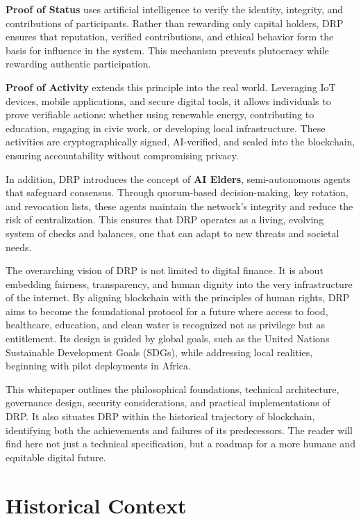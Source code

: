 \documentclass[11pt,a4paper]{article}
\begin{document}
\textbf{Proof of Status} uses artificial intelligence to verify the identity, integrity, and contributions of participants. Rather than rewarding only capital holders, DRP ensures that reputation, verified contributions, and ethical behavior form the basis for influence in the system. This mechanism prevents plutocracy while rewarding authentic participation.

\textbf{Proof of Activity} extends this principle into the real world. Leveraging IoT devices, mobile applications, and secure digital tools, it allows individuals to prove verifiable actions: whether using renewable energy, contributing to education, engaging in civic work, or developing local infrastructure. These activities are cryptographically signed, AI-verified, and sealed into the blockchain, ensuring accountability without compromising privacy.

In addition, DRP introduces the concept of \textbf{AI Elders}, semi-autonomous agents that safeguard consensus. Through quorum-based decision-making, key rotation, and revocation lists, these agents maintain the network's integrity and reduce the risk of centralization. This ensures that DRP operates as a living, evolving system of checks and balances, one that can adapt to new threats and societal needs.

The overarching vision of DRP is not limited to digital finance. It is about embedding fairness, transparency, and human dignity into the very infrastructure of the internet. By aligning blockchain with the principles of human rights, DRP aims to become the foundational protocol for a future where access to food, healthcare, education, and clean water is recognized not as privilege but as entitlement. Its design is guided by global goals, such as the United Nations Sustainable Development Goals (SDGs), while addressing local realities, beginning with pilot deployments in Africa.

This whitepaper outlines the philosophical foundations, technical architecture, governance design, security considerations, and practical implementations of DRP. It also situates DRP within the historical trajectory of blockchain, identifying both the achievements and failures of its predecessors. The reader will find here not just a technical specification, but a roadmap for a more humane and equitable digital future.


\section{Historical Context}
\end{document}

